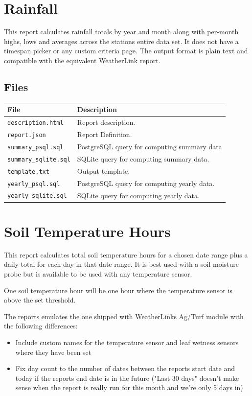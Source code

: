 \documentclass[a4paper,10pt]{book}
\begin{document}
\section{Rainfall}
This report calculates rainfall totals by year and month along with per-month highs, lows and averages across the stations entire data set. It does not have a timespan picker or any custom criteria page. The output format is plain text and compatible with the equivalent WeatherLink report.

\subsection{Files}
\begin{tabular}{p{3.8cm} p{10cm}}
\hline
\textbf{File} & \textbf{Description} \\
\hline
\verb|description.html| & Report description. \\
\verb|report.json| & Report Definition.\\
\verb|summary_psql.sql| & PostgreSQL query for computing summary data\\
\verb|summary_sqlite.sql| & SQLite query for computing summary data.\\
\verb|template.txt| & Output template.\\
\verb|yearly_psql.sql| & PostgreSQL query for computing yearly data.\\
\verb|yearly_sqlite.sql| & SQLite query for computing yearly data.\\
\hline
\end{tabular}

\section{Soil Temperature Hours}
This report calculates total soil temperature hours for a chosen date range plus a daily total for each day in that date range. It is best used with a soil moisture probe but is available to be used with any temperature sensor.

One soil temperature hour will be one hour where the temperature sensor is above the set threshold. 

The reports emulates the one shipped with WeatherLinks Ag/Turf module with the following differences:
\begin{itemize}
\item Include custom names for the temperature sensor and leaf wetness sensors where they have been set
\item Fix day count to the number of dates between the reports start date and today if the reports end date is in the future ("Last 30 days" doesn't make sense when the report is really run for this month and we're only 5 days in)
\end{itemize}
\end{document}
